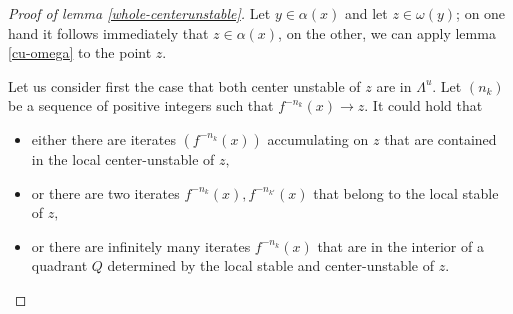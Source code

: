 \documentclass[a4paper,11pt]{article}
\theoremstyle{definition}
\def\La{\Lambda}
\def\La{\Lambda}
\begin{document}
\begin{proof}[Proof of lemma \ref{whole-centerunstable}]


Let $y\in \alpha(x)$ and let $z\in \omega(y)$; on one hand it follows immediately that $z\in \alpha(x)$, on the other, we can apply lemma \ref{cu-omega} to the point $z$. 

Let us consider first the case that  both center  unstable of $z$  are in $\La^u$.   Let $(n_k)$ be a sequence of positive integers  such that $f^{-n_k}(x)\to z$. It could hold that  
\begin{itemize}
\item[--] either there are iterates $(f^{-n_{k}}(x))$ accumulating on $z$  that are contained in the  local center-unstable of $z,$


\item[--] or there are two iterates $f^{-n_k}(x), f^{-n_{k'}}(x)$ that belong to the local stable of $z,$


\item[--] or there are infinitely many iterates $f^{-n_k}(x)$ that are in the interior of a  quadrant $Q$ determined  by the local stable and center-unstable of  $z.$

\end{itemize}


\end{proof}
\end{document}
